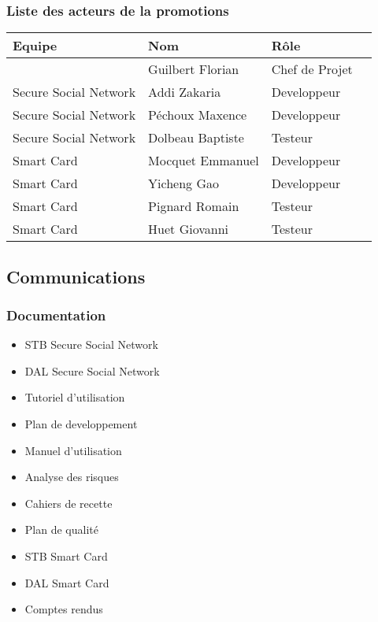 \documentclass[a4paper,11pt,french]{article}
\begin{document}
\subsubsection{Liste des acteurs de la promotions}
\begin{center}
	\begin{tabularx}{16cm}{|X|X|X|X|}
	\hline
	\bfseries{Equipe} & \bfseries{Nom} & \bfseries{Rôle}\\
	\hline
		& Guilbert Florian & Chef de Projet\\
	\hline
	Secure Social Network & Addi Zakaria & Developpeur\\
	\hline
	Secure Social Network & Péchoux Maxence & Developpeur\\
	\hline
	Secure Social Network & Dolbeau Baptiste & Testeur\\
	\hline
	Smart Card & Mocquet Emmanuel & Developpeur\\
	\hline
	Smart Card & Yicheng Gao & Developpeur\\
	\hline
	Smart Card & Pignard Romain & Testeur\\
	\hline
	Smart Card & Huet Giovanni & Testeur\\
	\hline
	\end{tabularx}
\end{center}
\vspace*{0cm}

\subsection{Communications}
\subsubsection{Documentation}
\begin{itemize}
	\item STB Secure Social Network
	\item DAL Secure Social Network
	\item Tutoriel d'utilisation
	\item Plan de developpement
	\item Manuel d'utilisation
	\item Analyse des risques
	\item Cahiers de recette
	\item Plan de qualité
	\item STB Smart Card
	\item DAL Smart Card
	\item Comptes rendus
\end{itemize}
\end{document}
